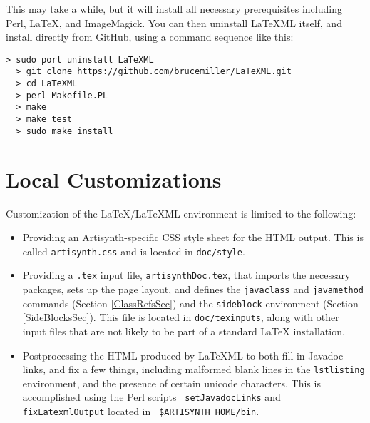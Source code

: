 \documentclass{article}
\begin{document}
This may take a while, but it will install all necessary prerequisites
including Perl, LaTeX, and ImageMagick. You can then uninstall LaTeXML
itself, and install directly from GitHub, using a command
sequence like this:

\begin{lstlisting}[]
  > sudo port uninstall LaTeXML
  > git clone https://github.com/brucemiller/LaTeXML.git
  > cd LaTeXML
  > perl Makefile.PL
  > make
  > make test
  > sudo make install
\end{lstlisting}

\section{Local Customizations}
\label{LocalCustomizationSec}

Customization of the LaTeX/LaTeXML environment is limited to the
following:

\begin{itemize}

\item Providing an Artisynth-specific CSS style sheet for the HTML output.
This is called {\tt artisynth.css} and is located in {\tt doc/style}.

\item Providing a {\tt .tex} input file, {\tt artisynthDoc.tex}, that
imports the necessary packages, sets up the page layout, and defines
the {\tt \BKS javaclass} and {\tt \BKS javamethod} commands (Section
\ref{ClassRefsSec}) and the {\tt sideblock} environment (Section
\ref{SideBlocksSec}).  This file is located in {\tt doc/texinputs},
along with other input files that are not likely to be part of a
standard LaTeX installation.

\item Postprocessing the HTML produced by LaTeXML to both fill in
Javadoc links, and fix a few things, including malformed blank lines
in the {\tt lstlisting} environment, and the presence of certain
unicode characters.  This is accomplished using the Perl scripts {\tt
setJavadocLinks} and {\tt fixLatexmlOutput} located in {\tt
\$ARTISYNTH\_HOME/bin}.

\end{itemize}
\end{document}
